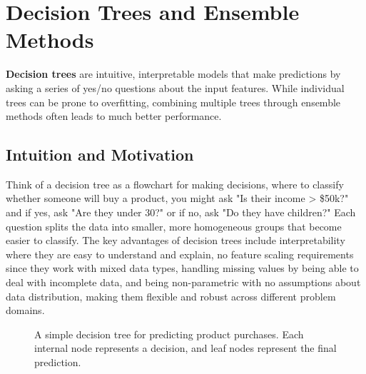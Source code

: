 
\section{Decision Trees and Ensemble Methods }
\label{sec:decision-trees}

\textbf{Decision trees} are intuitive, interpretable models that make predictions by asking a series of yes/no questions about the input features. While individual trees can be prone to overfitting, combining multiple trees through ensemble methods often leads to much better performance.

\subsection{Intuition and Motivation}

Think of a decision tree as a flowchart for making decisions, where to classify whether someone will buy a product, you might ask "Is their income > \$50k?" and if yes, ask "Are they under 30?" or if no, ask "Do they have children?" Each question splits the data into smaller, more homogeneous groups that become easier to classify. The key advantages of decision trees include interpretability where they are easy to understand and explain, no feature scaling requirements since they work with mixed data types, handling missing values by being able to deal with incomplete data, and being non-parametric with no assumptions about data distribution, making them flexible and robust across different problem domains.

\begin{figure}[htbp]
\centering
{}
\caption{A simple decision tree for predicting product purchases. Each internal node represents a decision, and leaf nodes represent the final prediction.}
\label{fig:decision-tree-example}
\end{figure}

